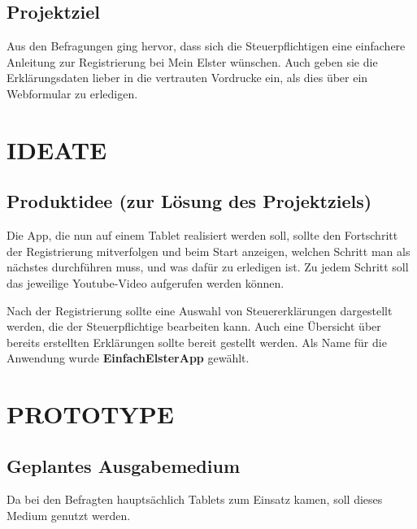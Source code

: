 \subsection{Projektziel}\label{Projektziel}

Aus den Befragungen ging hervor, dass sich die Steuerpflichtigen eine einfachere Anleitung zur Registrierung bei \grq{}Mein Elster\grq{} wünschen. Auch geben sie die Erklärungsdaten lieber in die vertrauten Vordrucke ein, als dies über ein Webformular zu erledigen.



\section{IDEATE}\label{IDEATE}


\subsection{Produktidee (zur Lösung des Projektziels)}\label{Produktidee (zur Lösung des Projektziels) }
Die App, die nun auf einem Tablet realisiert werden soll, sollte den Fortschritt der Registrierung mitverfolgen und beim Start anzeigen, welchen Schritt man als nächstes durchführen muss, und was dafür zu erledigen ist. Zu jedem Schritt soll das jeweilige Youtube-Video aufgerufen werden können.

Nach der Registrierung sollte eine Auswahl von Steuererklärungen dargestellt werden, die der Steuerpflichtige bearbeiten kann. Auch eine Übersicht über bereits erstellten Erklärungen sollte bereit gestellt werden. Als Name für die Anwendung wurde \grqq{}\textbf{EinfachElsterApp}\grqq{} gewählt.


\section{PROTOTYPE}\label{PROTOTYPE}

\subsection{Geplantes Ausgabemedium}\label{Geplantes Ausgabemedium}
Da bei den Befragten hauptsächlich Tablets zum Einsatz kamen, soll dieses Medium genutzt werden.

